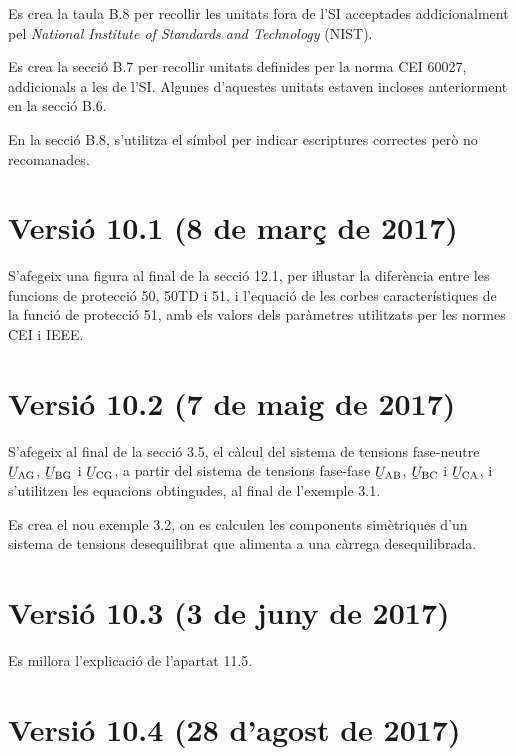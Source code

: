 Es crea la taula B.8 per recollir les unitats fora de l'SI acceptades addicionalment pel \textit{National Institute of Standards and Technology} (NIST).

Es crea la secció B.7 per recollir  unitats definides per la norma  CEI 60027, addicionals a les de l'SI. Algunes d'aquestes unitats estaven incloses anteriorment en la secció B.6.

En la secció B.8, s'utilitza el símbol \textcolor{Blue}\faQuestionCircle{} per indicar escriptures correctes però no recomanades.

\section*{Versió 10.1 (8 de març de 2017)}

S'afegeix una figura al final de la secció 12.1, per iŀlustar la diferència entre les funcions de protecció 50, 50TD i 51, i l'equació de les corbes característiques de la funció de protecció 51, amb els valors dels paràmetres utilitzats per les normes CEI i IEEE.

\section*{Versió 10.2 (7 de maig de 2017)}

S'afegeix al final de la secció 3.5, el càlcul del sistema de tensions fase-neutre $\cmplx{U}\ped{AG}$, $\cmplx{U}\ped{BG}$ i $\cmplx{U}\ped{CG}$, a partir del sistema de tensions fase-fase $\cmplx{U}\ped{AB}$, $\cmplx{U}\ped{BC}$ i $\cmplx{U}\ped{CA}$, i s'utilitzen les equacions obtingudes, al final de l'exemple 3.1.

Es crea el nou exemple 3.2, on es calculen les components simètriques d'un sistema de tensions desequilibrat que alimenta a una càrrega desequilibrada.

\section*{Versió 10.3 (3 de juny de 2017)}

Es millora l'explicació de l'apartat 11.5.

\section*{Versió 10.4 (28 d'agost de 2017)}

